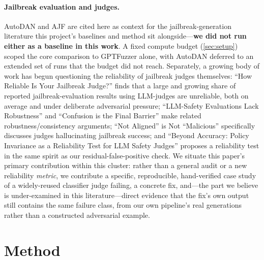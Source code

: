 \documentclass[11pt,letterpaper]{article}
\begin{document}
\paragraph{Jailbreak evaluation and judges.}
AutoDAN \citep{liu2023autodan} and AJF \citep{yu2025ajf} are cited here as context for the
jailbreak-generation literature this project's baselines and method sit alongside---\textbf{we
did not run either as a baseline in this work}. A fixed compute budget (\cref{sec:setup}) scoped
the core comparison to GPTFuzzer alone, with AutoDAN deferred to an extended set of runs that the
budget did not reach. Separately, a growing body of work has begun questioning
the reliability of jailbreak judges themselves: ``How Reliable Is Your Jailbreak Judge?''
\citep{gao2026reliable} finds that a large and growing share of reported jailbreak-evaluation
results using LLM-judges are unreliable, both on average and under deliberate adversarial
pressure; ``LLM-Safety Evaluations Lack Robustness'' \citep{beyer2025llmsafety} and ``Confusion
is the Final Barrier'' \citep{yan2025confusion} make related robustness/consistency arguments;
``Not Aligned'' is Not ``Malicious'' \citep{mei2024notaligned} specifically discusses judges
hallucinating jailbreak success; and ``Beyond Accuracy: Policy Invariance as a Reliability Test
for LLM Safety Judges'' \citep{weng2026beyond} proposes a reliability test in the same spirit as
our residual-false-positive check. We situate this paper's primary contribution within this
cluster: rather than a general audit or a new reliability \textit{metric}, we contribute a
specific, reproducible, hand-verified case study of a widely-reused classifier judge failing, a
concrete fix, and---the part we believe is under-examined in this literature---direct evidence
that the fix's own output still contains the same failure class, from our own pipeline's real
generations rather than a constructed adversarial example.

\section{Method}
\label{sec:method}
\end{document}
